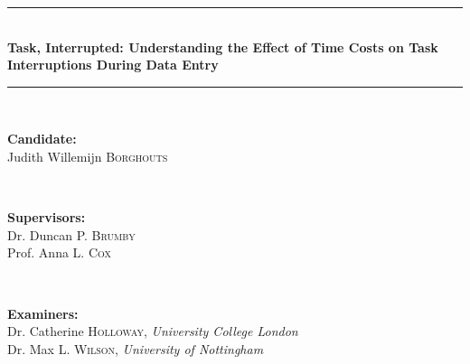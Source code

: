 \begin{titlepage}

\newcommand{\HRule}{\rule{\linewidth}{0.5mm}} %

\center %



\HRule \\[0.4cm]
{\Large \bfseries Task, Interrupted: Understanding the Effect of Time Costs on Task Interruptions During Data Entry
}\\[0.4cm] %
\HRule \\[1.5cm]
 

\begin{minipage}{0.4\textwidth}
\begin{flushleft} \large
\textbf{Candidate:}\\
Judith Willemijn \textsc{Borghouts} %
\end{flushleft}
\end{minipage}
~
\begin{minipage}{0.4\textwidth}
\begin{flushright} \large
\textbf{Supervisors:} \\
Dr. Duncan P. \textsc{Brumby} \\%
Prof. Anna L. \textsc{Cox}
\end{flushright}
\end{minipage}\\[4cm]


\begin{minipage}{0.8\textwidth}
\begin{flushright} \large
\textbf{Examiners:} \\
Dr. Catherine \textsc{Holloway}, \textit{University College London} \\%
Dr. Max L. \textsc{Wilson}, \textit{University of Nottingham}
\end{flushright}
\end{minipage}\\[4cm]


\end{titlepage}
